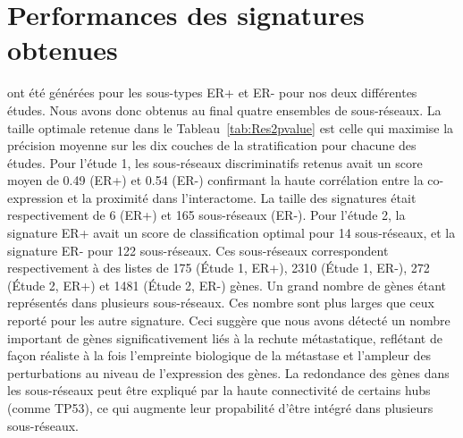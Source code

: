 		\section{\textcolor{green!45!black}{Performances des signatures obtenues}}
		 ont été générées pour les sous-types ER+ et ER- pour nos deux différentes études.
		Nous avons donc obtenus au final quatre ensembles de sous-réseaux.
		La taille optimale retenue dans le Tableau~\ref{tab:Res2pvalue} est celle qui maximise la précision moyenne sur les dix couches de la stratification pour chacune des études.
		Pour l'étude 1, les sous-réseaux discriminatifs retenus avait un score moyen de 0.49 (ER+) et 0.54 (ER-) confirmant la haute corrélation entre la co-expression et la proximité dans l'interactome.
		La taille des signatures était respectivement de 6 (ER+) et 165 sous-réseaux (ER-).
		Pour l'étude 2, la signature ER+ avait un score de classification optimal pour 14 sous-réseaux, et la signature ER- pour 122 sous-réseaux.
		Ces sous-réseaux correspondent respectivement à des listes de 175 (Étude 1, ER+), 2310 (Étude 1, ER-), 272 (Étude 2, ER+) et 1481 (Étude 2, ER-) gènes.
		Un grand nombre de gènes étant représentés dans plusieurs sous-réseaux.
		Ces nombre sont plus larges que ceux reporté pour les autre signature.
		Ceci suggère que nous avons détecté un nombre important de gènes significativement liés à la rechute métastatique, reflétant de façon réaliste à la fois l'empreinte biologique de la métastase et l'ampleur des perturbations au niveau de l'expression des gènes.
		La redondance des gènes dans les sous-réseaux peut être expliqué par la haute connectivité de certains hubs (comme \acs{TP53}), ce qui augmente leur propabilité d'être intégré dans plusieurs sous-réseaux.

